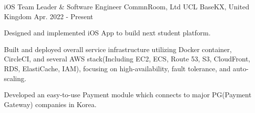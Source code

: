 \begin{cventries}
  \cventry
    {iOS Team Leader \& Software Engineer} %
    {CommnRoom, Ltd} %
    {UCL BaseKX, United Kingdom} %
    {Apr. 2022 - Present} %
    {
      \begin{cvitems} %
        \item {Designed and implemented iOS App to build next student platform.}
        \item {Built and deployed overall service infrastructure utilizing Docker container, CircleCI, and several AWS stack(Including EC2, ECS, Route 53, S3, CloudFront, RDS, ElastiCache, IAM), focusing on high-availability, fault tolerance, and auto-scaling.}
        \item {Developed an easy-to-use Payment module which connects to major PG(Payment Gateway) companies in Korea.}
      \end{cvitems}
    }




\end{cventries}
